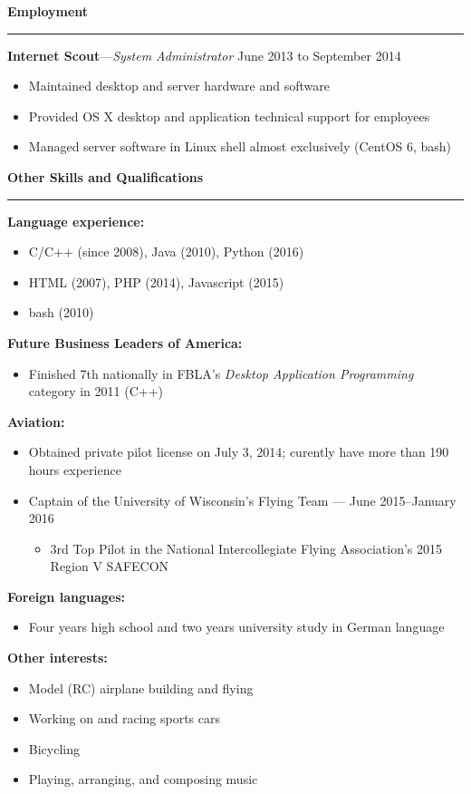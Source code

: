\documentclass[12pt,letterpaper]{article}
\newenvironment{details}{
    \vspace{-.8em}
    \begin{itemize}
        \renewcommand \labelitemi{\labelitemiv}
        \setlength{\itemsep}{0pt}
        \setlength{\parskip}{-1pt}
        \setlength{\parsep}{0pt}
    }{
    \end{itemize}
    \vspace{-.5em}
}
\newcommand{\hr} {
    \vspace{-1em}
    \par\rule{\textwidth}{1pt}
    \vspace{-1.5em}
}
\newcommand{\ressection}[1] {
    \par{\large \textbf{#1}}
    \hr
}
\newenvironment{employment} {
    \setlength{\parskip}{0pt}
    \ressection{Employment}
}{
    \vspace{0.5em}
}
\newenvironment{other} {
    \ressection{Other Skills and Qualifications}
    \setlength{\parskip}{3pt}
}{
    \vspace{0.5em}
}
\newcommand{\employer}[3] {
    {\par\textbf{#1}---\textit{#2} \hfill #3}
    \par
}
\begin{document}
\begin{employment}
\employer{Internet Scout}{System Administrator}{June 2013 to September 2014}
\begin{details}
    \item Maintained desktop and server hardware and software
    \item Provided OS X desktop and application technical support for employees
    \item Managed server software in Linux shell almost exclusively (CentOS 6, bash)
\end{details}
\end{employment}

\begin{other}
\par \textbf{Language experience:}
\begin{details}
    \item C/C++ (since 2008), Java (2010), Python (2016)
    \item HTML (2007), PHP (2014), Javascript (2015)
    \item bash (2010)
\end{details}
\par \textbf{Future Business Leaders of America:}
\begin{details}
    \item Finished 7th nationally in FBLA's \textit{Desktop Application Programming} category in 2011 (C++)
\end{details}

\par \textbf{Aviation:}
\begin{details}
    \item Obtained private pilot license on July 3, 2014; curently have more than 190 hours experience
    \item Captain of the University of Wisconsin's Flying Team --- June 2015--January 2016
    \vspace{.5em}
    \begin{details}
        \item 3rd Top Pilot in the National Intercollegiate Flying Association's 2015 Region V SAFECON
    \end{details}
\end{details}

\par \textbf{Foreign languages:}
\begin{details}
    \item Four years high school and two years university study in German language
\end{details}

\par \textbf{Other interests:}
\begin{details}
    \item Model (RC) airplane building and flying
    \item Working on and racing sports cars
    \item Bicycling
    \item Playing, arranging, and composing music
\end{details}
\end{other}
\end{document}
